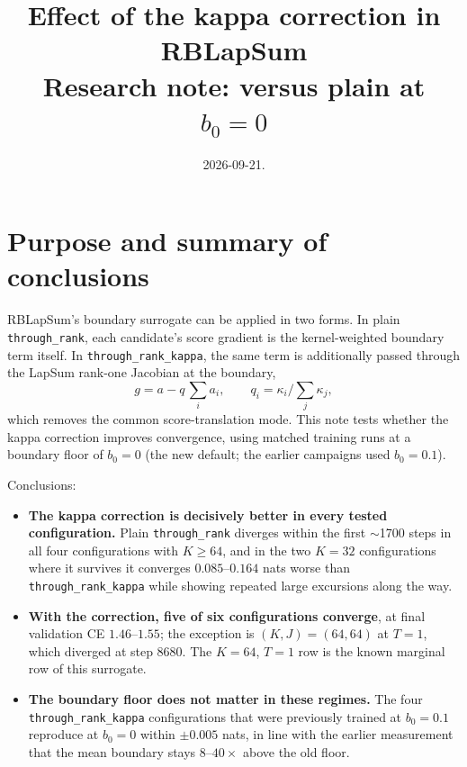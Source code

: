 \documentclass[11pt,a4paper]{article}
\title{Effect of the kappa correction in RBLapSum\\[2pt]
\large Research note: \code{through\_rank\_kappa} versus plain
\code{through\_rank} at $b_0=0$}
\author{}
\date{2026-09-21.}
\newcommand{\code}[1]{\texttt{#1}}
\begin{document}
\maketitle
\vspace{-2em}

\section{Purpose and summary of conclusions}

RBLapSum's boundary surrogate can be applied in two forms. In plain
\code{through\_rank}, each candidate's score gradient is the
kernel-weighted boundary term itself. In \code{through\_rank\_kappa}, the
same term is additionally passed through the LapSum rank-one Jacobian at
the boundary,
\[
g = a - q\,{\textstyle\sum_i a_i},\qquad q_i=\kappa_i/{\textstyle\sum_j \kappa_j},
\]
which removes the common score-translation mode. This note tests whether
the kappa correction improves convergence, using matched training runs at a
boundary floor of $b_0=0$ (the new default; the earlier campaigns used
$b_0=0.1$).

Conclusions:

\begin{itemize}[leftmargin=1.4em]
\item \textbf{The kappa correction is decisively better in every tested
configuration.} Plain \code{through\_rank} diverges within the first
$\sim$1700 steps in all four configurations with $K\geq 64$, and in the two
$K=32$ configurations where it survives it converges $0.085$--$0.164$ nats
worse than \code{through\_rank\_kappa} while showing repeated large
excursions along the way.

\item \textbf{With the correction, five of six configurations converge},
at final validation CE $1.46$--$1.55$; the exception is $(K,J)=(64,64)$ at
$T=1$, which diverged at step 8680. The $K=64$, $T=1$ row is the known
marginal row of this surrogate.

\item \textbf{The boundary floor does not matter in these regimes.} The
four \code{through\_rank\_kappa} configurations that were previously
trained at $b_0=0.1$ reproduce at $b_0=0$ within $\pm0.005$ nats, in line
with the earlier measurement that the mean boundary stays $8$--$40\times$
above the old floor.
\end{itemize}
\end{document}
